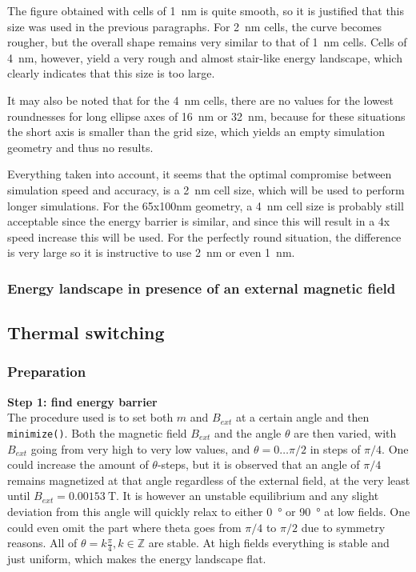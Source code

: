 \documentclass[10pt,a4paper]{article}
\newcommand{\code}[1]{\texttt{#1}}
\begin{document}
The figure obtained with cells of \SI{1}{\nano\metre} is quite smooth, so it is justified that this size was used in the previous paragraphs. For \SI{2}{\nano\metre} cells, the curve becomes rougher, but the overall shape remains very similar to that of \SI{1}{\nano\metre} cells. Cells of \SI{4}{\nano\metre}, however, yield a very rough and almost stair-like energy landscape, which clearly indicates that this size is too large. \par
It may also be noted that for the \SI{4}{\nano\metre} cells, there are no values for the lowest roundnesses for long ellipse axes of \SI{16}{\nano\metre} or \SI{32}{\nano\metre}, because for these situations the short axis is smaller than the grid size, which yields an empty simulation geometry and thus no results. \par
Everything taken into account, it seems that the optimal compromise between simulation speed and accuracy, is a \SI{2}{\nano\metre} cell size, which will be used to perform longer simulations. For the 65x100nm geometry, a \SI{4}{\nano\metre} cell size is probably still acceptable since the energy barrier is similar, and since this will result in a 4x speed increase this will be used. For the perfectly round situation, the difference is very large so it is instructive to use \SI{2}{\nano\metre} or even \SI{1}{\nano\metre}.

\subsubsection{Energy landscape in presence of an external magnetic field}



\subsection{Thermal switching}


\subsubsection{Preparation}
\textbf{Step 1: find energy barrier} \\
The procedure used is to set both $m$ and $B_{ext}$ at a certain angle and then \code{minimize()}. Both the magnetic field $B_{ext}$ and the angle $\theta$ are then varied, with $B_{ext}$ going from very high to very low values, and $\theta=0\dots\pi/2$ in steps of $\pi/4$. One could increase the amount of $\theta$-steps, but it is observed that an angle of $\pi/4$ remains magnetized at that angle regardless of the external field, at the very least until $B_{ext} = \SI{0.00153}{\tesla}$. It is however an unstable equilibrium and any slight deviation from this angle will quickly relax to either \SI{0}{\degree} or \SI{90}{\degree} at low fields.
One could even omit the part where theta goes from $\pi/4$ to $\pi/2$ due to symmetry reasons.
All of $\theta = k\frac{\pi}{4} , k\in\mathbb{Z}$ are stable.
At high fields everything is stable and just uniform, which makes the energy landscape flat.
\end{document}
